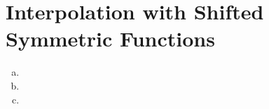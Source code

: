 \section{Interpolation with Shifted Symmetric Functions}\label{sec:p5}

\begin{enumerate}[(a)]
\item
\item
\item
\end{enumerate}